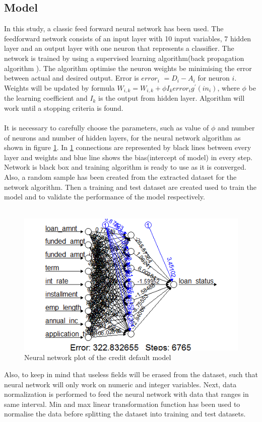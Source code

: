 \documentclass{article}[]
\begin{document}
\subsection{Model}
In this study, a classic feed forward neural network has been used. The feedforward network consists of an input layer with 10 input variables, 7 hidden layer and an output layer with one neuron that represents a classifier. The network is trained by using a supervised learning algorithm(back propagation algorithm \cite{hecht1988theory}\cite{pineda1987generalization}). The algorithm optimise the neuron weights be minimising the error between actual and desired output. Error is $error_{i}$ $= D_{i} - A_{i}$ for neuron $i$. Weights will be updated by formula $W_{i,k} = W_{i,k} + \phi I_{k}error_{i}g^{'}(in_{i})$, where $\phi$ be the learning coefficient and $I_{k}$ is the output from hidden layer. Algorithm will work until a stopping criteria is found.\\\\
It is necessary to carefully choose the parameters, such as value of $\phi$ and number of neurons and number of hidden layers, for the neural network algorithm as shown in figure \ref{fig:nn}. In \ref{fig:nn} connections are represented by black lines between every layer and weights and blue line shows the bias(intercept of model) in every step. Network is black box and training algorithm is ready to use as it is converged.  Also, a random sample has been created from the extracted dataset for the network algorithm. Then a training and test dataset are created used to train the model and to validate the performance of the model respectively.\\\\ 
\begin{figure}[!htb]
\centering
\includegraphics[width=1\textwidth]{nn.png}
\caption{Neural network plot of the credit default model}
\label{fig:nn}
\end{figure}
Also, to keep in mind that useless fields will be erased from the dataset, such that neural network will only work on numeric and integer variables. Next, data normalization is performed to feed the neural network with data that ranges in same interval. Min and max linear transformation function has been used to normalise the data before splitting the dataset into training and test datasets. 
\end{document}
